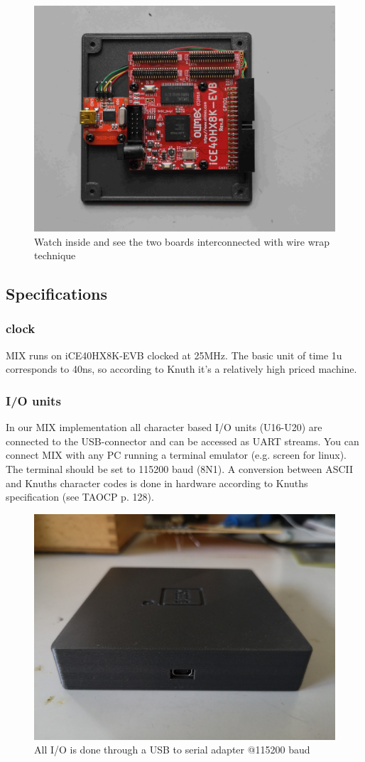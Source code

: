 \documentclass[a4paper,ngerman]{scrartcl}
\begin{document}
\begin{figure}[H]
	\centering
	\includegraphics[width=0.7\linewidth]{../MIX_inside.jpg}
	\caption{Watch inside and see the two boards interconnected with wire wrap technique}
	\label{fig:mixinside}
\end{figure}


\subsection{Specifications}

\subsubsection{clock}
MIX runs on iCE40HX8K-EVB clocked at 25MHz. The basic unit of time 1u corresponds to 40ns, so according to Knuth it's a relatively high priced machine.

\subsubsection{I/O units}
In our MIX implementation all character based I/O units (U16-U20) are connected to the USB-connector and can be accessed as UART streams. You can connect MIX with any PC running a terminal emulator (e.g. screen for linux). The terminal should be set to 115200 baud (8N1). A conversion between ASCII and Knuths character codes is done in hardware according to Knuths specification (see TAOCP p. 128).
\begin{figure}
	\centering
	\includegraphics[width=0.7\linewidth]{../MIX_usb.jpg}
	\caption{All I/O is done through a USB to serial adapter @115200 baud}
	\label{fig:mixusb}
\end{figure}
\end{document}
